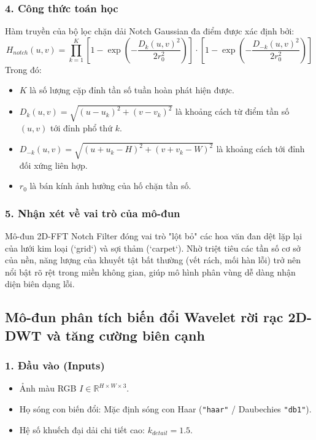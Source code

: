 \subsubsection*{4. Công thức toán học}
Hàm truyền của bộ lọc chặn dải Notch Gaussian đa điểm được xác định bởi:
\begin{equation}
    H_{notch}(u, v) = \prod_{k=1}^K \left[ 1 - \exp\left( -\frac{D_k(u, v)^2}{2 r_0^2} \right) \right] \cdot \left[ 1 - \exp\left( -\frac{D_{-k}(u, v)^2}{2 r_0^2} \right) \right]
\end{equation}
Trong đó:
\begin{itemize}
    \item $K$ là số lượng cặp đỉnh tần số tuần hoàn phát hiện được.
    \item $D_k(u, v) = \sqrt{(u - u_k)^2 + (v - v_k)^2}$ là khoảng cách từ điểm tần số $(u, v)$ tới đỉnh phổ thứ $k$.
    \item $D_{-k}(u, v) = \sqrt{(u + u_k - H)^2 + (v + v_k - W)^2}$ là khoảng cách tới đỉnh đối xứng liên hợp.
    \item $r_0$ là bán kính ảnh hưởng của hố chặn tần số.
\end{itemize}

\subsubsection*{5. Nhận xét về vai trò của mô-đun}
Mô-đun 2D-FFT Notch Filter đóng vai trò "lột bỏ" các hoa văn đan dệt lặp lại của lưới kim loại (`grid`) và sợi thảm (`carpet`). Nhờ triệt tiêu các tần số cơ sở của nền, năng lượng của khuyết tật bất thường (vết rách, mối hàn lỗi) trở nên nổi bật rõ rệt trong miền không gian, giúp mô hình phân vùng dễ dàng nhận diện biên dạng lỗi.

\subsection{Mô-đun phân tích biến đổi Wavelet rời rạc 2D-DWT và tăng cường biên cạnh}

\subsubsection*{1. Đầu vào (Inputs)}
\begin{itemize}
    \item Ảnh màu RGB $I \in \mathbb{R}^{H \times W \times 3}$.
    \item Họ sóng con biến đổi: Mặc định sóng con Haar (\texttt{"haar"} / Daubechies \texttt{"db1"}).
    \item Hệ số khuếch đại dải chi tiết cao: $k_{detail} = 1.5$.
\end{itemize}

